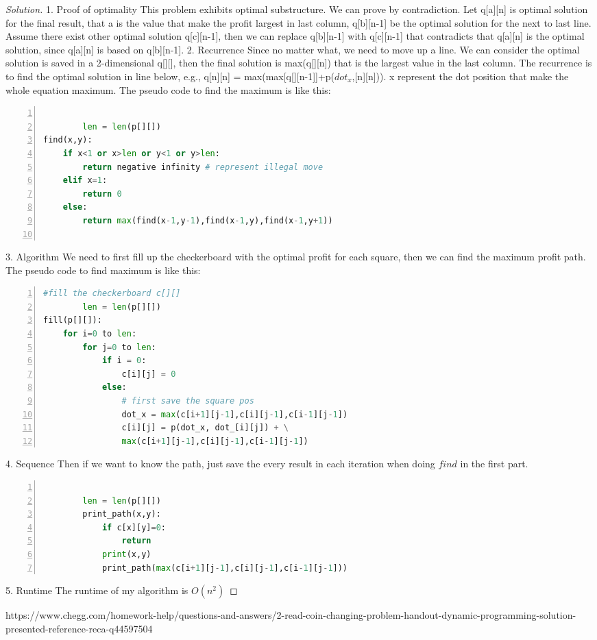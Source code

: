 \documentclass[12pt]{article}
\begin{document}
\begin{proof}[Solution]
	1. Proof of optimality
	This problem exhibits optimal substructure. We can prove by contradiction. Let q[a][n] is optimal solution for the final result, that a is the value that make the profit largest in last column, q[b][n-1] be the optimal solution for the next to last line. Assume there exist other optimal solution q[c][n-1], then we can replace q[b][n-1] with q[c][n-1] that contradicts that q[a][n] is the optimal solution, since q[a][n] is based on q[b][n-1].
	2. Recurrence
	Since no matter what, we need to move up a line. We can consider the optimal solution is saved in a 2-dimensional q[][], then the final solution is max(q[][n]) that is the largest value in the last column. The recurrence is to find the optimal solution in line below, e.g., q[n][n] = max(max[q[][n-1]]+p($dot_x$,[n][n])). x represent the dot position that make the whole equation maximum. The pseudo code to find the maximum is like this:
	\begin{lstlisting}[language={python},numbers=left,numberstyle=\tiny,%frame=shadowbox,  
		rulesepcolor=\color{red!20!green!20!blue!20},  
		keywordstyle=\color{blue!70!black},  
		commentstyle=\color{blue!90!},  
		basicstyle=\ttfamily]  
		
		len = len(p[][])
find(x,y):
	if x<1 or x>len or y<1 or y>len:
		return negative infinity # represent illegal move
	elif x=1:
		return 0
	else:
		return max(find(x-1,y-1),find(x-1,y),find(x-1,y+1))
		
	\end{lstlisting}
	3. Algorithm
	We need to first fill up the checkerboard with the optimal profit for each square, then we can find the maximum profit path. The pseudo code to find maximum is like this:
	\begin{lstlisting}[language={python},numbers=left,numberstyle=\tiny,%frame=shadowbox,  
		rulesepcolor=\color{red!20!green!20!blue!20},  
		keywordstyle=\color{blue!70!black},  
		commentstyle=\color{blue!90!},  
		basicstyle=\ttfamily]  
		#fill the checkerboard c[][]
		len = len(p[][])
fill(p[][]):
	for i=0 to len:
		for j=0 to len:
			if i = 0:
				c[i][j] = 0
			else:
				# first save the square pos
				dot_x = max(c[i+1][j-1],c[i][j-1],c[i-1][j-1])
				c[i][j] = p(dot_x, dot_[i][j]) + \
				max(c[i+1][j-1],c[i][j-1],c[i-1][j-1])
	\end{lstlisting}
	4. Sequence
	Then if we want to know the path, just save the every result in each iteration when doing $find$ in the first part.
	\begin{lstlisting}[language={python},numbers=left,numberstyle=\tiny,%frame=shadowbox,  
		rulesepcolor=\color{red!20!green!20!blue!20},  
		keywordstyle=\color{blue!70!black},  
		commentstyle=\color{blue!90!},  
		basicstyle=\ttfamily]  
		
		len = len(p[][])
		print_path(x,y):
			if c[x][y]=0:
				return
			print(x,y)
			print_path(max(c[i+1][j-1],c[i][j-1],c[i-1][j-1]))
	\end{lstlisting}
	5. Runtime
	The runtime of my algorithm is $O(n^2)$
\end{proof}



\begin{thebibliography}{ch}
 https://www.chegg.com/homework-help/questions-and-answers/2-read-coin-changing-problem-handout-dynamic-programming-solution-presented-reference-reca-q44597504
\end{thebibliography}
\end{document}
